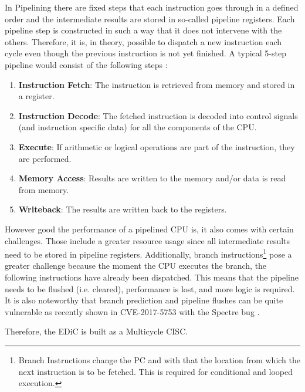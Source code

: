 In Pipelining there are fixed steps that each instruction goes through in a defined order and the intermediate results are stored in so-called pipeline registers.
Each pipeline step is constructed in such a way that it does not intervene with the others.
Therefore, it is, in theory, possible to dispatch a new instruction each cycle even though the previous instruction is not yet finished.
A typical 5-step pipeline would consist of the following steps \cite{PattersonDavid2016RuRD}:
\begin{enumerate}
  \item \textbf{Instruction Fetch}: The instruction is retrieved from memory and stored in a register.
  \item \textbf{Instruction Decode}: The fetched instruction is decoded into control signals (and instruction specific data) for all the components of the \gls{CPU}.
  \item \textbf{Execute}: If arithmetic or logical operations are part of the instruction, they are performed.
  \item \textbf{Memory Access}: Results are written to the memory and/or data is read from memory.
  \item \textbf{Writeback}: The results are written back to the registers.
\end{enumerate}
However good the performance of a pipelined \gls{CPU} is, it also comes with certain challenges.
Those include a greater resource usage since all intermediate results need to be stored in pipeline registers.
Additionally, branch instructions\footnote{Branch Instructions change the \gls{PC} and with that the location from which the next instruction is to be fetched. This is required for conditional and looped execution.} pose a greater challenge because the moment the \gls{CPU} executes the branch, the following instructions have already been dispatched.
This means that the pipeline needs to be flushed (i.e. cleared), performance is lost, and more logic is required.
It is also noteworthy that branch prediction and pipeline flushes can be quite vulnerable as recently shown in CVE-2017-5753 with the Spectre bug \cite{CVE-2017-5753}.

Therefore, the \gls{EDiC} is built as a Multicycle \gls{CISC}.

